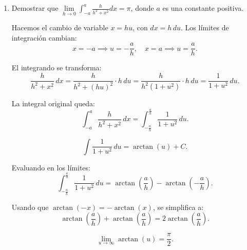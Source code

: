 \documentclass{article}
\begin{document}
\begin{enumerate}
\[
s-1 > -1 \implies s > 0.
\]

Por lo tanto, para que no haya divergencia en \(x \to 0\), **\(s > 0\)**.

Cuando \(x \to \infty\), el término \(\frac{x^{s-1}}{1+x}\) se aproxima a \(x^{s-2}\), ya que el término dominante es \(x\) en el denominador. La integral cerca de \(x = \infty\) será aproximadamente:

\[
\int_M^\infty x^{s-2} \, dx, \quad \text{(con \(M\) grande)}.
\]

Esta integral converge si el exponente de \(x^{s-2}\) es menor que \(-1\), es decir, si:

\[
s-2 < -1 \implies s < 1.
\]

Por lo tanto, para que no haya divergencia en \(x \to \infty\), \(s < 1\).



Combinando ambas condiciones:

\[
0 < s < 1.
\]


La integral \(\int_0^\infty \frac{x^{s-1}}{1+x} \, dx\) converge si y solo si:

\[
s \in (0, 1).
\]

	
	\item Demostrar que $ \lim\limits_{h\rightarrow0}\int_{-a}^{a} \frac{h}{h^2+x^2}dx=\pi $, donde $ a $ es una constante positiva.

 
Hacemos el cambio de variable \( x = hu \), con \( dx = h \, du \). Los límites de integración cambian:
\[
x = -a \implies u = -\frac{a}{h}, \quad x = a \implies u = \frac{a}{h}.
\]

El integrando se transforma:
\[
\frac{h}{h^2 + x^2} \, dx = \frac{h}{h^2 + (hu)^2} \cdot h \, du = \frac{h}{h^2(1 + u^2)} \cdot h \, du = \frac{1}{1 + u^2} \, du.
\]

La integral original queda:
\[
\int_{-a}^{a} \frac{h}{h^2 + x^2} \, dx = \int_{-\frac{a}{h}}^{\frac{a}{h}} \frac{1}{1 + u^2} \, du.
\]

\[
\int \frac{1}{1 + u^2} \, du = \arctan(u) + C.
\]

Evaluando en los límites:
\[
\int_{-\frac{a}{h}}^{\frac{a}{h}} \frac{1}{1 + u^2} \, du = \arctan\left(\frac{a}{h}\right) - \arctan\left(-\frac{a}{h}\right).
\]

Usando que \( \arctan(-x) = -\arctan(x) \), se simplifica a:
\[
\arctan\left(\frac{a}{h}\right) + \arctan\left(\frac{a}{h}\right) = 2 \arctan\left(\frac{a}{h}\right).
\]

\[
\lim_{u \to \infty} \arctan(u) = \frac{\pi}{2}.
\]


\end{enumerate}
\end{document}
